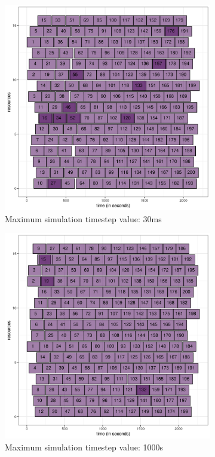 \begin{figure}
	\begin{subfigure}{0.5\textwidth}
		\centering
		\includegraphics[width=\textwidth]{imgs/max-timestep_30ms_gantt.png}
		\caption{Maximum simulation timestep value: 30ms}
		\label{fig:timestep_5ms}
	\end{subfigure}
	\begin{subfigure}{0.5\textwidth}
		\centering
		\includegraphics[width=\textwidth]{imgs/max-timestep_1000s_gantt.png}
		\caption{Maximum simulation timestep value: 1000s}
		\label{fig:timesteap_50ms}
	\end{subfigure}

	\caption{}
	\label{fig:timestep_overlap}
\end{figure}

